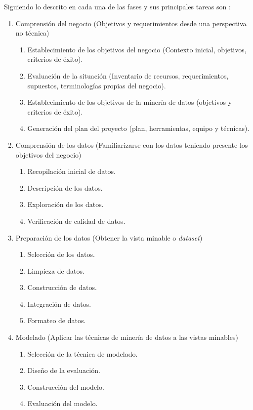 Siguiendo lo descrito en \cite{chapman2000crisp} cada una de las fases y sus principales tareas son :
\begin{enumerate}
   
 \item Comprensión del negocio (Objetivos y requerimientos desde una perspectiva no técnica)
    \begin{enumerate}
    \item Establecimiento de los objetivos del negocio (Contexto inicial, objetivos, criterios
    de éxito).
    \item Evaluación de la situación (Inventario de recursos, requerimientos, supuestos,
    terminologías propias del negocio).
    \item Establecimiento de los objetivos de la minería de datos (objetivos y criterios de
    éxito).
    \item Generación del plan del proyecto (plan, herramientas, equipo y técnicas).
    \end{enumerate}

 \item  Comprensión de los datos (Familiarizarse con los datos teniendo presente los objetivos
del negocio)
    \begin{enumerate}
    \item Recopilación inicial de datos.
    \item Descripción de los datos.
    \item Exploración de los datos.
    \item Verificación de calidad de datos.
    \end{enumerate}

 \item  Preparación de los datos (Obtener la vista minable o \textit{dataset})
    \begin{enumerate}
    \item Selección de los datos.
    \item Limpieza de datos.
    \item Construcción de datos.
    \item Integración de datos.
    \item Formateo de datos.
    \end{enumerate}

 \item  Modelado (Aplicar las técnicas de minería de datos a las vistas minables)
    \begin{enumerate}
    \item Selección de la técnica de modelado.
    \item Diseño de la evaluación.
    \item Construcción del modelo.
    \item Evaluación del modelo.
    \end{enumerate}


\end{enumerate}
